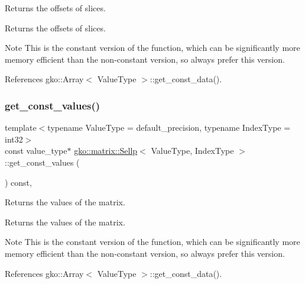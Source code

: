 Returns the offsets of slices. 

\begin{DoxyReturn}{Returns}
the offsets of slices.
\end{DoxyReturn}
\begin{DoxyNote}{Note}
This is the constant version of the function, which can be significantly more memory efficient than the non-\/constant version, so always prefer this version. 
\end{DoxyNote}


References gko\+::\+Array$<$ Value\+Type $>$\+::get\+\_\+const\+\_\+data().

\mbox{\label{classgko_1_1matrix_1_1Sellp_a8a3c4738049b7e6819806bb51e1a5523}} 
\subsubsection{\texorpdfstring{get\+\_\+const\+\_\+values()}{get\_const\_values()}}
{\footnotesize\ttfamily template$<$typename Value\+Type = default\+\_\+precision, typename Index\+Type = int32$>$ \\
const value\+\_\+type$\ast$ \hyperlink{classgko_1_1matrix_1_1Sellp}{gko\+::matrix\+::\+Sellp}$<$ Value\+Type, Index\+Type $>$\+::get\+\_\+const\+\_\+values (\begin{DoxyParamCaption}{ }\end{DoxyParamCaption}) const\hspace{0.3cm}{\ttfamily [inline]}, {\ttfamily [noexcept]}}



Returns the values of the matrix. 

\begin{DoxyReturn}{Returns}
the values of the matrix.
\end{DoxyReturn}
\begin{DoxyNote}{Note}
This is the constant version of the function, which can be significantly more memory efficient than the non-\/constant version, so always prefer this version. 
\end{DoxyNote}


References gko\+::\+Array$<$ Value\+Type $>$\+::get\+\_\+const\+\_\+data().

\mbox{\label{classgko_1_1matrix_1_1Sellp_aab92660b6249e243e3ad35a51c557f3b}} 
